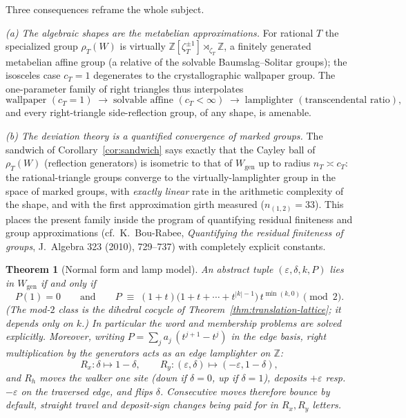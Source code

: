 \documentclass[11pt,a4paper]{article}
\newtheorem{theorem}{Theorem}
\theoremstyle{remark}
\theoremstyle{plain}
\begin{document}
Three consequences reframe the whole subject.

\emph{(a) The algebraic shapes are the metabelian approximations.}
For rational $T$ the specialized group $\rho_T(W)$ is virtually
$\mathbb{Z}[\zeta_T^{\pm 1}] \rtimes_{\zeta_T} \mathbb{Z}$, a
finitely generated metabelian affine group (a relative of the solvable
Baumslag--Solitar groups); the isosceles case $c_T = 1$ degenerates to
the crystallographic wallpaper group.  The one-parameter family of
right triangles thus interpolates
\[
\text{wallpaper } (c_T = 1) \;\longrightarrow\;
\text{solvable affine } (c_T < \infty) \;\longrightarrow\;
\text{lamplighter } (\text{transcendental ratio}),
\]
and every right-triangle side-reflection group, of any shape, is
amenable.

\emph{(b) The deviation theory is a quantified convergence of marked
groups.}  The sandwich of Corollary~\ref{cor:sandwich} says exactly
that the Cayley ball of $\rho_T(W)$ (reflection generators) is
isometric to that of $W_{\mathrm{gen}}$ up to radius $n_T \asymp c_T$:
the rational-triangle groups converge to the virtually-lamplighter
group in the space of marked groups, with \emph{exactly linear} rate
in the arithmetic complexity of the shape, and with the first
approximation girth measured ($n_{(1,2)} = 33$).  This places the
present family inside the program of quantifying residual finiteness
and group approximations (cf.\ K.~Bou-Rabee, \emph{Quantifying the
residual finiteness of groups}, J.\ Algebra 323 (2010), 729--737)
with completely explicit constants.

\begin{theorem}[Normal form and lamp model]
\label{thm:normal-form}
An abstract tuple $(\varepsilon, \delta, k, P)$ lies in
$W_{\mathrm{gen}}$ if and only if
\[
P(1) = 0
\qquad\text{and}\qquad
P \;\equiv\; (1+t)\bigl(1 + t + \cdots + t^{|k|-1}\bigr)\,
t^{\min(k,0)} \pmod 2 .
\]
(The mod-$2$ class is the dihedral cocycle of
Theorem~\ref{thm:translation-lattice}; it depends only on $k$.)  In
particular the word and membership problems are solved explicitly.
Moreover, writing $P = \sum_j a_j\,(t^{j+1} - t^j)$ in the edge basis,
right multiplication by the generators acts as an \emph{edge
lamplighter} on $\mathbb{Z}$:
\[
R_x \colon \delta \mapsto 1 - \delta, \qquad
R_y \colon (\varepsilon, \delta) \mapsto (-\varepsilon, 1-\delta),
\]
and $R_h$ moves the walker one site (down if $\delta = 0$, up if
$\delta = 1$), deposits $+\varepsilon$ resp.\ $-\varepsilon$ on the
traversed edge, and flips $\delta$.  Consecutive moves therefore bounce
by default, straight travel and deposit-sign changes being paid for in
$R_x, R_y$ letters.
\end{theorem}
\end{document}
